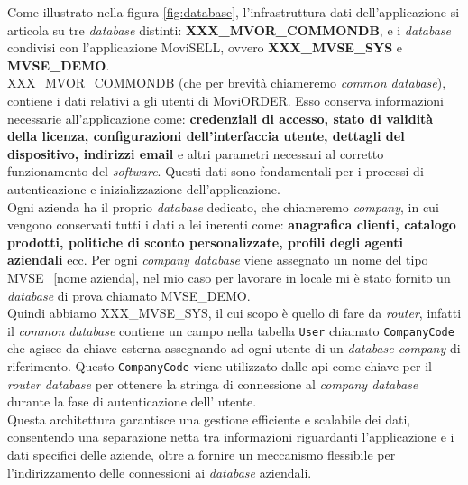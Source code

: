 Come illustrato nella figura \ref{fig:database}, l'infrastruttura dati dell'applicazione {\movi} si articola su tre 
\textit{database} distinti: \textbf{XXX\_MVOR\_COMMONDB}, e i \textit{database} condivisi con l'applicazione 
MoviSELL, ovvero \textbf{XXX\_MVSE\_SYS} e \textbf{MVSE\_DEMO}.\\
XXX\_MVOR\_COMMONDB (che per brevità chiameremo \textit{common database}), contiene i dati relativi a gli utenti di MoviORDER. 
Esso conserva informazioni necessarie all'applicazione come: \textbf{credenziali di accesso, stato di validità della licenza, 
configurazioni dell'interfaccia utente, dettagli del dispositivo, indirizzi email} e altri parametri necessari al corretto 
funzionamento del \textit{software}. Questi dati sono fondamentali per i processi di autenticazione e inizializzazione 
dell'applicazione.\\
Ogni azienda ha il proprio \textit{database} dedicato, che chiameremo \textit{company}, in cui vengono conservati tutti i dati 
a lei inerenti come: \textbf{anagrafica clienti, catalogo prodotti, politiche di sconto personalizzate, profili degli agenti 
aziendali} ecc. Per ogni \textit{company database} viene assegnato un nome del tipo MVSE\_[nome azienda], nel mio caso per lavorare 
in locale mi è stato fornito un \textit{database} di prova chiamato MVSE\_DEMO.\\
Quindi abbiamo XXX\_MVSE\_SYS, il cui scopo è quello di fare da \textit{router}, infatti il \textit{common database} contiene un campo 
nella tabella \texttt{User} chiamato \texttt{CompanyCode} che agisce da chiave esterna assegnando ad ogni utente di {\movi} 
un \textit{database company} di riferimento. Questo \texttt{CompanyCode} viene utilizzato dalle \gls{api} come chiave per il 
\textit{router database} per ottenere la stringa di connessione al \textit{company database} durante la fase di autenticazione dell'
utente.\\
Questa architettura garantisce una gestione efficiente e scalabile dei dati, consentendo una separazione netta tra informazioni 
riguardanti l'applicazione e i dati specifici delle aziende, oltre a fornire un meccanismo flessibile per l'indirizzamento 
delle connessioni ai \textit{database} aziendali.

